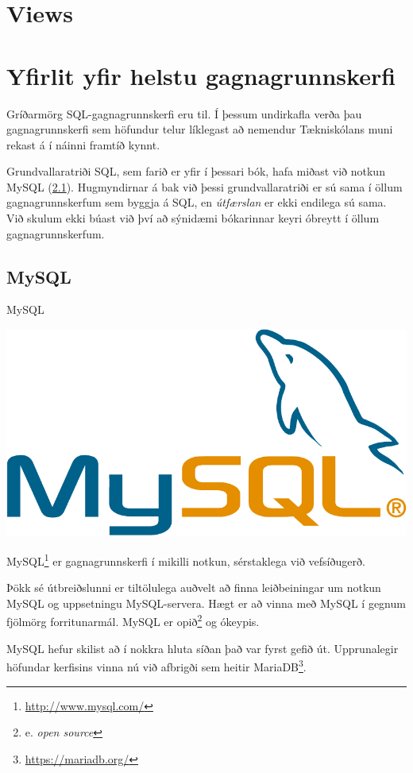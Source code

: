 \section{Views}
\label{undirkafli:views}
\section{Yfirlit yfir helstu gagnagrunnskerfi}
\label{undirkafli:helstu-gagnagrunnskerfi}
Gríðarmörg SQL-gagnagrunnskerfi eru til. Í þessum undirkafla verða þau gagnagrunnskerfi sem höfundur telur líklegast að nemendur Tækniskólans muni rekast á í náinni framtíð kynnt.

Grundvallaratriði SQL, sem farið er yfir í þessari bók, hafa miðast við notkun MySQL (\ref{undirkafli:mysql}). Hugmyndirnar á bak við þessi grundvallaratriði er sú sama í öllum gagnagrunnskerfum sem byggja á SQL, en \emph{útfærslan} er ekki endilega sú sama. Við skulum ekki búast við því að sýnidæmi bókarinnar keyri óbreytt í öllum gagnagrunnskerfum.
\subsection{MySQL}
\label{undirkafli:mysql}
\begin{marginfigure}
\caption{MySQL}
\label{mynd:mysql}
\centering
\includegraphics[width=\linewidth]{myndir/mysql}
\end{marginfigure}
MySQL\footnote{\url{http://www.mysql.com/}} er gagnagrunnskerfi í mikilli notkun, sérstaklega við vefsíðugerð.

Þökk sé útbreiðslunni er tiltölulega auðvelt að finna leiðbeiningar um notkun MySQL og uppsetningu MySQL-servera. Hægt er að vinna með MySQL í gegnum fjölmörg forritunarmál. MySQL er opið\footnote{e. \emph{open source}} og ókeypis.

MySQL hefur skilist að í nokkra hluta síðan það var fyrst gefið út. Upprunalegir höfundar kerfisins vinna nú við afbrigði sem heitir MariaDB\footnote{\url{https://mariadb.org/}}.
